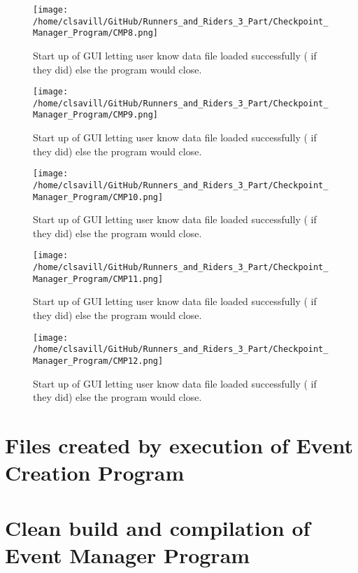 \documentclass[a4paper,12pt]{article}
\begin{document}
\begin{figure}[H]
\texttt{[image: /home/clsavill/GitHub/Runners\_and\_Riders\_3\_Part/Checkpoint\_Manager\_Program/CMP8.png]}
\caption{Start up of GUI letting user know data file loaded successfully ( if they did) else the program would close.}
\end{figure}

\begin{figure}[H]
\texttt{[image: /home/clsavill/GitHub/Runners\_and\_Riders\_3\_Part/Checkpoint\_Manager\_Program/CMP9.png]}
\caption{Start up of GUI letting user know data file loaded successfully ( if they did) else the program would close.}
\end{figure}

\begin{figure}[H]
\texttt{[image: /home/clsavill/GitHub/Runners\_and\_Riders\_3\_Part/Checkpoint\_Manager\_Program/CMP10.png]}
\caption{Start up of GUI letting user know data file loaded successfully ( if they did) else the program would close.}
\end{figure}

\begin{figure}[H]
\texttt{[image: /home/clsavill/GitHub/Runners\_and\_Riders\_3\_Part/Checkpoint\_Manager\_Program/CMP11.png]}
\caption{Start up of GUI letting user know data file loaded successfully ( if they did) else the program would close.}
\end{figure}

\begin{figure}[H]
\texttt{[image: /home/clsavill/GitHub/Runners\_and\_Riders\_3\_Part/Checkpoint\_Manager\_Program/CMP12.png]}
\caption{Start up of GUI letting user know data file loaded successfully ( if they did) else the program would close.}
\end{figure}

\section{Files created by execution of Event Creation Program}

\section{Clean build and compilation of Event Manager Program}

\end{document}
